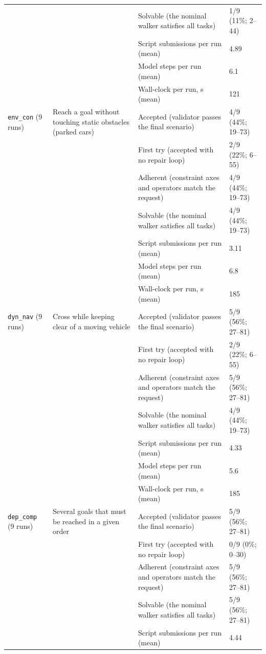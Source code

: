 \begin{longtable}{@{}p{1.7cm}p{2.9cm}p{4.4cm}p{3.1cm}@{}}
 &  & Solvable (the nominal walker satisfies all tasks) & 1/9 (11\%; 2--44) \\
 &  & Script submissions per run (mean) & 4.89 \\
 &  & Model steps per run (mean) & 6.1 \\
 &  & Wall-clock per run, s (mean) & 121 \\
\midrule
\texttt{env\_con} (9 runs) & Reach a goal without touching static obstacles (parked cars) & Accepted (validator passes the final scenario) & 4/9 (44\%; 19--73) \\
 &  & First try (accepted with no repair loop) & 2/9 (22\%; 6--55) \\
 &  & Adherent (constraint axes and operators match the request) & 4/9 (44\%; 19--73) \\
 &  & Solvable (the nominal walker satisfies all tasks) & 4/9 (44\%; 19--73) \\
 &  & Script submissions per run (mean) & 3.11 \\
 &  & Model steps per run (mean) & 6.8 \\
 &  & Wall-clock per run, s (mean) & 185 \\
\midrule
\texttt{dyn\_nav} (9 runs) & Cross while keeping clear of a moving vehicle & Accepted (validator passes the final scenario) & 5/9 (56\%; 27--81) \\
 &  & First try (accepted with no repair loop) & 2/9 (22\%; 6--55) \\
 &  & Adherent (constraint axes and operators match the request) & 5/9 (56\%; 27--81) \\
 &  & Solvable (the nominal walker satisfies all tasks) & 4/9 (44\%; 19--73) \\
 &  & Script submissions per run (mean) & 4.33 \\
 &  & Model steps per run (mean) & 5.6 \\
 &  & Wall-clock per run, s (mean) & 185 \\
\midrule
\texttt{dep\_comp} (9 runs) & Several goals that must be reached in a given order & Accepted (validator passes the final scenario) & 5/9 (56\%; 27--81) \\
 &  & First try (accepted with no repair loop) & 0/9 (0\%; 0--30) \\
 &  & Adherent (constraint axes and operators match the request) & 5/9 (56\%; 27--81) \\
 &  & Solvable (the nominal walker satisfies all tasks) & 5/9 (56\%; 27--81) \\
 &  & Script submissions per run (mean) & 4.44 \\

\end{longtable}

